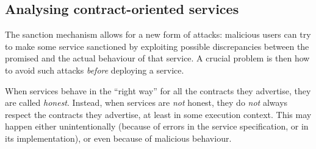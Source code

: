 \subsection*{Analysing contract-oriented services}

The sanction mechanism
allows for a new form of attacks: 
malicious users can try
to make some service sanctioned by exploiting possible discrepancies between
the promised and the actual behaviour of that service. %
A crucial problem is then
how to avoid such attacks \emph{before} deploying a service. %

When services behave in the ``right way'' for all the contracts
they advertise,
they are called \emph{honest}. %
Instead, when services are \emph{not} honest,
they do \emph{not} always respect the contracts they advertise,
at least in some execution context. %
This may happen either unintentionally
(because of errors in the service specification, or in its implementation),
or even because of malicious behaviour.

